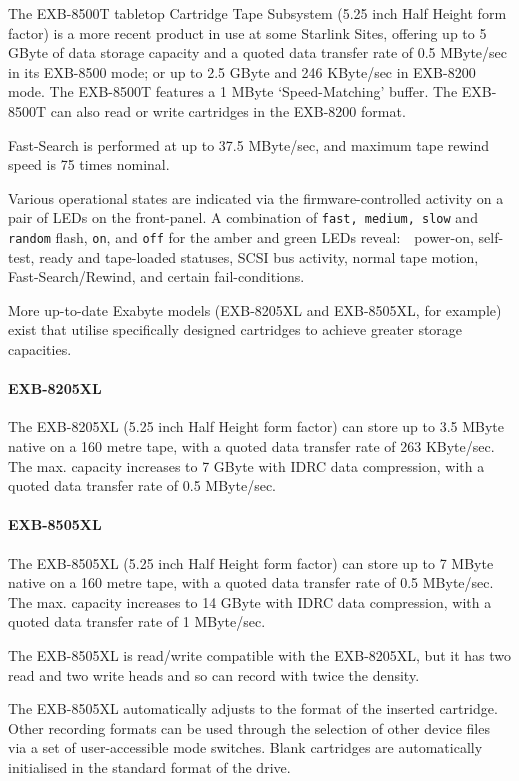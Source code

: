 The EXB-8500T tabletop Cartridge Tape Subsystem (5.25 inch Half Height form
factor) is a more recent product in use at some Starlink Sites, offering up
to 5 GByte of data storage capacity and a quoted data transfer rate of 0.5
MByte/sec in its EXB-8500 mode; or up to 2.5 GByte and 246 KByte/sec in
EXB-8200 mode. The EXB-8500T features a 1 MByte `Speed-Matching' buffer. The
EXB-8500T can also read or write cartridges in the EXB-8200 format.

Fast-Search is performed at up to 37.5 MByte/sec, and maximum tape rewind
speed is 75 times nominal.

Various operational states are indicated via the firmware-controlled activity
on a pair of LEDs on the front-panel. A combination of {\tt fast, medium, slow}
and {\tt random} flash, {\tt on}, and {\tt off} for the amber and green
LEDs reveal:\ \ power-on, self-test, ready and tape-loaded statuses, SCSI bus
activity, normal tape motion, Fast-Search/Rewind, and certain fail-conditions.

More up-to-date Exabyte models (EXB-8205XL and EXB-8505XL, for example)
exist that utilise specifically designed cartridges to achieve greater
storage capacities.

\paragraph {EXB-8205XL}

The EXB-8205XL (5.25 inch Half Height form factor) can store up to 3.5 MByte
native on a 160 metre tape, with a quoted data transfer rate of 263
KByte/sec. The max. capacity increases to 7 GByte with IDRC data compression,
with a quoted data transfer rate of 0.5 MByte/sec.

\paragraph {EXB-8505XL}

The EXB-8505XL (5.25 inch Half Height form factor) can store up to 7 MByte
native on a 160 metre tape, with a quoted data transfer rate of 0.5
MByte/sec. The max. capacity increases to 14 GByte with IDRC data compression,
with a quoted data transfer rate of 1 MByte/sec.

The EXB-8505XL is read/write compatible with the EXB-8205XL, but it has two
read and two write heads and so can record with twice the density.

The EXB-8505XL automatically adjusts to the format of the inserted cartridge.
Other recording formats can be used through the selection of other device
files via a set of user-accessible mode switches. Blank cartridges are
automatically initialised in the standard format of the drive.


